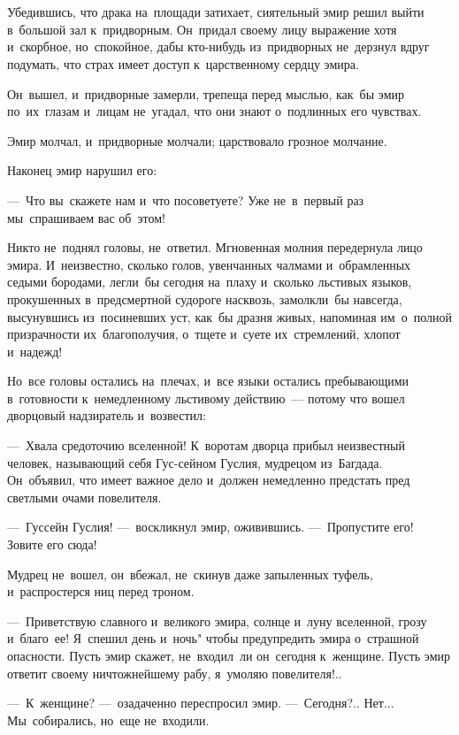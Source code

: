 \documentclass[12pt,a4paper]{book}
\begin{document}
\chapter{}

Убедившись, что драка на~площади затихает, сиятельный эмир решил выйти в~большой зал к~придворным. Он~придал своему лицу выражение хотя и~скорбное, но~спокойное, дабы кто-нибудь из~придворных не~дерзнул вдруг подумать, что страх имеет доступ к~царственному сердцу эмира.

Он~вышел, и~придворные замерли, трепеща перед мыслью, как~бы эмир по~их~глазам и~лицам не~угадал, что они знают о~подлинных его чувствах.

Эмир молчал, и~придворные молчали; царствовало грозное молчание.

Наконец эмир нарушил его:

—~Что вы~скажете нам и~что посоветуете? Уже не~в~первый раз мы~спрашиваем вас об~этом!

Никто не~поднял головы, не~ответил. Мгновенная молния передернула лицо эмира. И~неизвестно, сколько голов, увенчанных чалмами и~обрамленных седыми бородами, легли~бы сегодня на~плаху и~сколько льстивых языков, прокушенных в~предсмертной судороге насквозь, замолкли~бы навсегда, высунувшись из~посиневших уст, как~бы дразня живых, напоминая им~о~полной призрачности их~благополучия, о~тщете и~суете их~стремлений, хлопот и~надежд!

Но~все головы остались на~плечах, и~все языки остались пребывающими в~готовности к~немедленному льстивому действию~— потому что вошел дворцовый надзиратель и~возвестил:

—~Хвала средоточию вселенной! К~воротам дворца прибыл неизвестный человек, называющий себя Гус-сейном Гуслия, мудрецом из~Багдада. Он~объявил, что имеет важное дело и~должен немедленно предстать пред светлыми очами повелителя.

—~Гуссейн Гуслия! —~воскликнул эмир, оживившись. —~Пропустите его! Зовите его сюда!

Мудрец не~вошел, он~вбежал, не~скинув даже запыленных туфель, и~распростерся ниц перед троном.

—~Приветствую славного и~великого эмира, солнце и~луну вселенной, грозу и~благо~ее! Я~спешил день и~ночь" чтобы предупредить эмира о~страшной опасности. Пусть эмир скажет, не~входил~ли он~сегодня к~женщине. Пусть эмир ответит своему ничтожнейшему рабу, я~умоляю повелителя!..

—~К~женщине? —~озадаченно переспросил эмир. —~Сегодня?.. Нет... Мы~собирались, но~еще не~входили.
\end{document}
